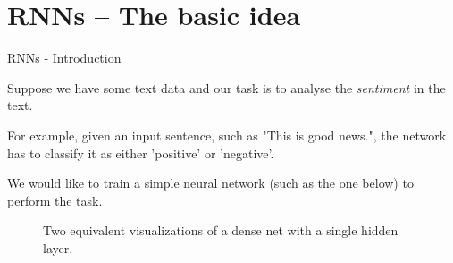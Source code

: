 \section{RNNs -- The basic idea}

\begin{frame} {RNNs - Introduction}
  \begin{itemize}
    \item \small{Suppose we have some text data and our task is to analyse the \textit{sentiment} in the text.
    \item For example, given an input sentence, such as "This is good news.", the network has to classify it as either 'positive' or 'negative'.
    \item We would like to train a simple neural network (such as the one below) to perform the task.}
  \end{itemize}
  \begin{figure}
      \centering
      \caption{\footnotesize{Two equivalent visualizations of a dense net with a single hidden layer.}}
  \end{figure}
\end{frame}

